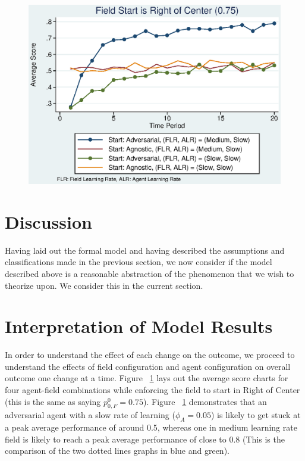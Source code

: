 \documentclass[12pt,letterpaper]{article}
\begin{document}
\begin{figure}[h]
\begin{centering}
  \caption{}
  \includegraphics[width=\textwidth]{frcmedium3a}
  \label{fig:3a}
\end{centering}
\end{figure}

\section{Discussion}
Having laid out the formal model and having described the assumptions and classifications made in the previous section, we now consider if the model described above is a reasonable abstraction of the phenomenon that we wish to theorize upon. We consider this in the current section.

\section{Interpretation of Model Results}
In order to understand the effect of each change on the outcome, we proceed to understand the effects of field configuration and agent configuration on overall outcome one change at a time. Figure ~\ref{fig:3a} lays out the average score charts for four agent-field combinations while enforcing the field to start in Right of Center (this is the same as saying $p_{0,F}^0 = 0.75$). Figure ~\ref{fig:3a} demonstrates that an adversarial agent with a slow rate of learning ($\phi_A = 0.05$) is likely to get stuck at a peak average performance of around 0.5, whereas one in medium learning rate field is likely to reach a peak average performance of close to 0.8 (This is the comparison of the two dotted lines graphs in blue and green). 
\end{document}

